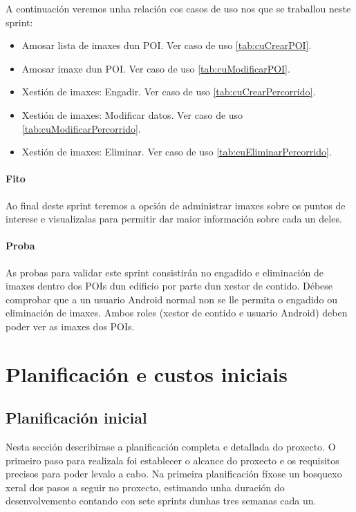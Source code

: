 A continuación veremos unha relación cos casos de uso nos que se traballou neste sprint:

\begin{itemize}
	\item Amosar lista de imaxes dun POI. Ver caso de uso \ref{tab:cuCrearPOI}.
	\item Amosar imaxe dun POI. Ver caso de uso \ref{tab:cuModificarPOI}.
	\item Xestión de imaxes: Engadir. Ver caso de uso \ref{tab:cuCrearPercorrido}.
	\item Xestión de imaxes: Modificar datos. Ver caso de uso \ref{tab:cuModificarPercorrido}.
	\item Xestión de imaxes: Eliminar. Ver caso de uso \ref{tab:cuEliminarPercorrido}.
\end{itemize} 

\paragraph{Fito}
Ao final deste sprint teremos a opción de administrar imaxes sobre os puntos de interese e visualizalas para permitir dar maior información sobre cada un deles.

\paragraph{Proba}
As probas para validar este sprint consistirán no engadido e eliminación de imaxes dentro dos POIs dun edificio por parte dun xestor de contido. Débese comprobar que a un usuario Android normal non se lle permita o engadido ou eliminación de imaxes. Ambos roles (xestor de contido e usuario Android) deben poder ver as imaxes dos POIs.


\section{Planificación e custos iniciais}

\subsection{Planificación inicial}
Nesta sección describirase a planificación completa e detallada do proxecto. O primeiro paso para realizala foi establecer o alcance do proxecto e os requisitos precisos para poder levalo a cabo. Na primeira planificación fíxose un bosquexo xeral dos pasos a seguir no proxecto, estimando unha duración do desenvolvemento contando con sete sprints dunhas tres semanas cada un.

